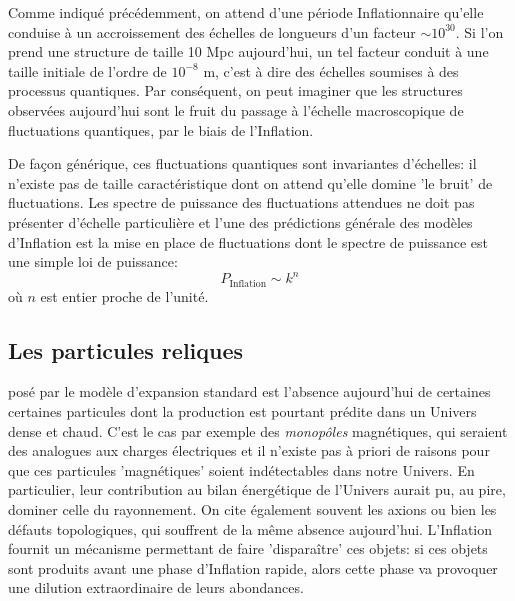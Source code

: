 Comme indiqué précédemment, on attend d'une période Inflationnaire qu'elle conduise à un accroissement des échelles de longueurs d'un facteur $\sim 10^{30}$. Si l'on prend une structure de taille 10 Mpc aujourd'hui, un tel facteur conduit à  une taille initiale de l'ordre de $10^{-8}$ m, c'est à dire des échelles soumises à des processus quantiques. Par conséquent, on peut imaginer que les structures observées aujourd'hui sont le fruit du passage à l'échelle macroscopique de fluctuations quantiques, par le biais de l'Inflation. 

De façon générique, ces fluctuations quantiques sont invariantes d'échelles: il n'existe pas de taille caractéristique dont on attend qu'elle domine 'le bruit' de fluctuations. Les spectre de puissance des fluctuations attendues ne doit pas présenter d'échelle particulière et l'une des prédictions générale des modèles d'Inflation est la mise en place de fluctuations dont le spectre de puissance est une simple loi de puissance:
\begin{equation}
P_\mathrm{Inflation}\sim k^n
\end{equation}
où $n$ est entier proche de l'unité.

\subsection{Les particules reliques}
 posé par le modèle d'expansion standard est l'absence aujourd'hui de certaines certaines particules dont la production est pourtant prédite dans un Univers dense et chaud. C'est le cas par exemple des \textit{monopôles} magnétiques, qui seraient des analogues aux charges électriques  et il n'existe pas à priori de raisons pour que ces particules 'magnétiques' soient indétectables dans notre Univers. En particulier, leur contribution au bilan énergétique de l'Univers aurait pu, au pire, dominer celle du rayonnement.
On cite également souvent les axions ou bien les défauts topologiques, qui souffrent de la même absence aujourd'hui.
L'Inflation fournit un mécanisme permettant de faire 'disparaître' ces objets: si ces objets sont produits avant une phase d'Inflation rapide, alors cette phase va provoquer une dilution extraordinaire de leurs abondances. 


